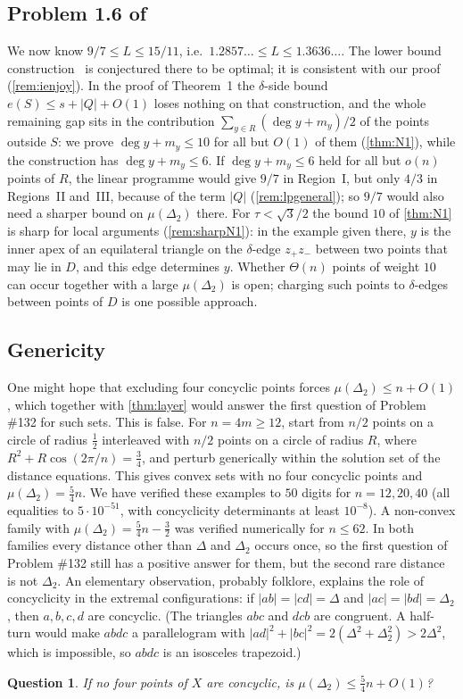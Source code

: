 \documentclass[11pt]{amsart}
\newtheorem{question}[theorem]{Question}
\theoremstyle{definition}
\theoremstyle{remark}
\newcommand{\Dt}{\Delta_2}
\newcommand{\mult}{\mu}
\begin{document}
\subsection*{\texorpdfstring{Problem 1.6 of~\cite{CDL25}}{Problem 1.6 of CDL}}
We now know $9/7\le L\le15/11$, i.e.\ $1.2857\ldots\le L\le1.3636\ldots$. The lower bound construction~\cite{ienjoymath} is conjectured there to be optimal; it is consistent with our proof (\cref{rem:ienjoy}). In the proof of Theorem~1 the $\delta$-side bound $e(S)\le s+|Q|+O(1)$ loses nothing on that construction, and the whole remaining gap sits in the contribution $\sum_{y\in R}(\deg y+m_y)/2$ of the points outside $S$: we prove $\deg y+m_y\le10$ for all but $O(1)$ of them (\cref{thm:N1}), while the construction has $\deg y+m_y\le6$. If $\deg y+m_y\le6$ held for all but $o(n)$ points of $R$, the linear programme would give $9/7$ in Region~I, but only $4/3$ in Regions~II and~III, because of the term $|Q|$ (\cref{rem:lpgeneral}); so $9/7$ would also need a sharper bound on $\mult(\Dt)$ there. For $\tau<\sqrt3/2$ the bound $10$ of \cref{thm:N1} is sharp for local arguments (\cref{rem:sharpN1}): in the example given there, $y$ is the inner apex of an equilateral triangle on the $\delta$-edge $z_+z_-$ between two points that may lie in $D$, and this edge determines $y$. Whether $\Theta(n)$ points of weight $10$ can occur together with a large $\mult(\Dt)$ is open; charging such points to $\delta$-edges between points of $D$ is one possible approach.

\subsection*{Genericity}
One might hope that excluding four concyclic points forces $\mult(\Dt)\le n+O(1)$, which together with \cref{thm:layer} would answer the first question of Problem \#132 for such sets. This is false. For $n=4m\ge12$, start from $n/2$ points on a circle of radius $\frac12$ interleaved with $n/2$ points on a circle of radius $R$, where $R^2+R\cos(2\pi/n)=\frac34$, and perturb generically within the solution set of the distance equations. This gives convex sets with no four concyclic points and $\mult(\Dt)=\frac54n$. We have verified these examples to $50$ digits for $n=12,20,40$ (all equalities to $5\cdot10^{-51}$, with concyclicity determinants at least $10^{-8}$). A non-convex family with $\mult(\Dt)=\frac54n-\frac32$ was verified numerically for $n\le62$. In both families every distance other than $\Delta$ and $\Dt$ occurs once, so the first question of Problem \#132 still has a positive answer for them, but the second rare distance is not $\Dt$. An elementary observation, probably folklore, explains the role of concyclicity in the extremal configurations: if $|ab|=|cd|=\Delta$ and $|ac|=|bd|=\Dt$, then $a,b,c,d$ are concyclic. (The triangles $abc$ and $dcb$ are congruent. A half-turn would make $abdc$ a parallelogram with $|ad|^2+|bc|^2=2(\Delta^2+\Dt^2)>2\Delta^2$, which is impossible, so $abdc$ is an isosceles trapezoid.)
\begin{question}\label{q:genericity}
If no four points of $X$ are concyclic, is $\mult(\Dt)\le\frac54n+O(1)$?
\end{question}
\end{document}
